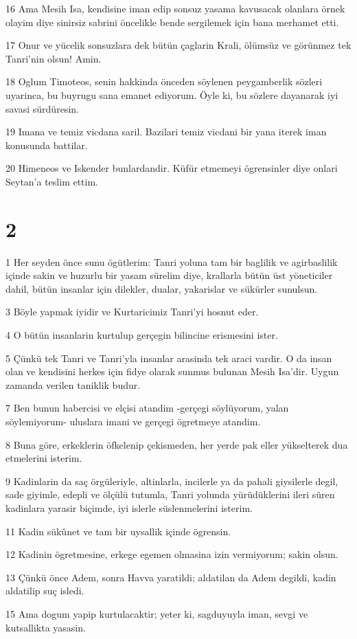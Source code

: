 \par 16 Ama Mesih Isa, kendisine iman edip sonsuz yasama kavusacak olanlara örnek olayim diye sinirsiz sabrini öncelikle bende sergilemek için bana merhamet etti.
\par 17 Onur ve yücelik sonsuzlara dek bütün çaglarin Krali, ölümsüz ve görünmez tek Tanri'nin olsun! Amin.
\par 18 Oglum Timoteos, senin hakkinda önceden söylenen peygamberlik sözleri uyarinca, bu buyrugu sana emanet ediyorum. Öyle ki, bu sözlere dayanarak iyi savasi sürdüresin.
\par 19 Imana ve temiz vicdana saril. Bazilari temiz vicdani bir yana iterek iman konusunda battilar.
\par 20 Himeneos ve Iskender bunlardandir. Küfür etmemeyi ögrensinler diye onlari Seytan'a teslim ettim.

\chapter{2}

\par 1 Her seyden önce sunu ögütlerim: Tanri yoluna tam bir baglilik ve agirbaslilik içinde sakin ve huzurlu bir yasam sürelim diye, krallarla bütün üst yöneticiler dahil, bütün insanlar için dilekler, dualar, yakarislar ve sükürler sunulsun.
\par 3 Böyle yapmak iyidir ve Kurtaricimiz Tanri'yi hosnut eder.
\par 4 O bütün insanlarin kurtulup gerçegin bilincine erismesini ister.
\par 5 Çünkü tek Tanri ve Tanri'yla insanlar arasinda tek araci vardir. O da insan olan ve kendisini herkes için fidye olarak sunmus bulunan Mesih Isa'dir. Uygun zamanda verilen taniklik budur.
\par 7 Ben bunun habercisi ve elçisi atandim -gerçegi söylüyorum, yalan söylemiyorum- uluslara imani ve gerçegi ögretmeye atandim.
\par 8 Buna göre, erkeklerin öfkelenip çekismeden, her yerde pak eller yükselterek dua etmelerini isterim.
\par 9 Kadinlarin da saç örgüleriyle, altinlarla, incilerle ya da pahali giysilerle degil, sade giyimle, edepli ve ölçülü tutumla, Tanri yolunda yürüdüklerini ileri süren kadinlara yarasir biçimde, iyi islerle süslenmelerini isterim.
\par 11 Kadin sükûnet ve tam bir uysallik içinde ögrensin.
\par 12 Kadinin ögretmesine, erkege egemen olmasina izin vermiyorum; sakin olsun.
\par 13 Çünkü önce Adem, sonra Havva yaratildi; aldatilan da Adem degildi, kadin aldatilip suç isledi.
\par 15 Ama dogum yapip kurtulacaktir; yeter ki, sagduyuyla iman, sevgi ve kutsallikta yasasin.

